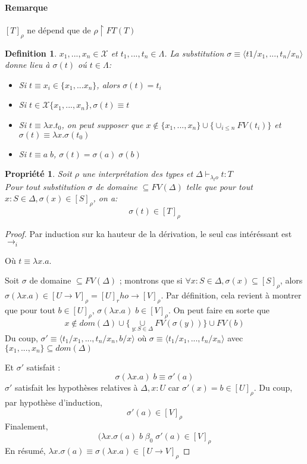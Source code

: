 \documentclass{article}
\newtheorem{prop}{Propriété}
\newtheorem{defi}{Definition}
\newcommand\lterm[2]{\lambda #1. #2}
\begin{document}
\paragraph{Remarque}
$[T]_\rho$ ne dépend que de $\rho \upharpoonright FT(T)$

\begin{defi}
$x_1,...,x_n \in \mathcal{X}$ et $t_1,...,t_n \in \Lambda$. La substitution $\sigma\equiv \langle t1/x_1,...,t_n/x_n\rangle$ donne lieu à $\sigma(t)$ oú $t\in \Lambda$:
\begin{itemize}[noitemsep,label=-]
\item Si $t\equiv x_i \in \{x_1,...x_n\}$, alors $\sigma(t)=t_i$
\item Si $t\in \mathcal{X}\{x_1,...,x_n\}, \sigma(t) \equiv t$
\item Si $t\equiv \lterm{x}{t_0}$, on peut supposer que 
$x\notin \{x_1,...,x_n\}\cup \{ \cup_{i\leq n}FV(t_i) \}$ 
et $\sigma (t) \equiv \lterm{x}{\sigma (t_0)}$
\item Si $t\equiv a\; b$, $\sigma(t)=\sigma(a)\; \sigma(b)$
\end{itemize}
\end{defi}

\begin{prop}
Soit $\rho$ une interprétation des types et $\Delta\vdash_{\lambda_to} t:T$\\
Pour tout substitution $\sigma$ de domaine $\subseteq FV(\Delta)$ telle que pour tout $x:S\in \Delta, \sigma (x) \in [S]_\rho$, on a:
\[\sigma ( t) \in [T]_\rho\]
\end{prop}
\begin{proof}
Par induction sur ka hauteur de la dérivation, le seul cas intéréssant est $\to_i$
\begin{prooftree}
\end{prooftree}
Où $t\equiv \lterm{x}{a}$.

Soit $\sigma$ de domaine $\subseteq FV(\Delta)$ ; montrons que si $\forall x : S \in \Delta, \sigma(x) \subseteq [S]_\rho$, alors $\sigma (\lterm{x}{a})\in [U\to V]_\rho = [U]_rho \to [V]_\rho$.
Par définition, cela revient à montrer que pour tout $b\in [U]_\rho$, $\sigma (\lterm{x}{a})\; b \in [V]_\rho$.
On peut faire en sorte que 
\[x\notin dom(\Delta) \cup \{ \underset{y:S\in \Delta}{\cup} FV(\sigma(y))\}\cup FV(b)\]
Du coup, $\sigma'\equiv \langle t_1/x_1,...,t_n/x_n,b/x\rangle$ où $\sigma \equiv \langle t_1/x_1,...,t_n/x_n\rangle$ avec $\{x_1,...,x_n\}\subseteq dom(\Delta)$

Et $\sigma'$ satisfait :
\[\sigma (\lterm{x}{a})\; b \equiv \sigma'(a)\]
$\sigma'$ satisfait les hypothèses relatives à $\Delta, x: U$ car $\sigma'(x)=b\in [U]_\rho$.
Du coup, par hypothèse d'induction,
\[\sigma'(a) \in [V]_\rho\]
Finalement,
\[(\lterm{x}{\sigma (a)}\; b \; \beta_0 \; \sigma' (a) \in [V]_\rho\]
En résumé, $\lterm{x}{\sigma (a)} \equiv \sigma (\lterm{x}{a}) \in [U\to V]_\rho$
\end{proof}
\end{document}
